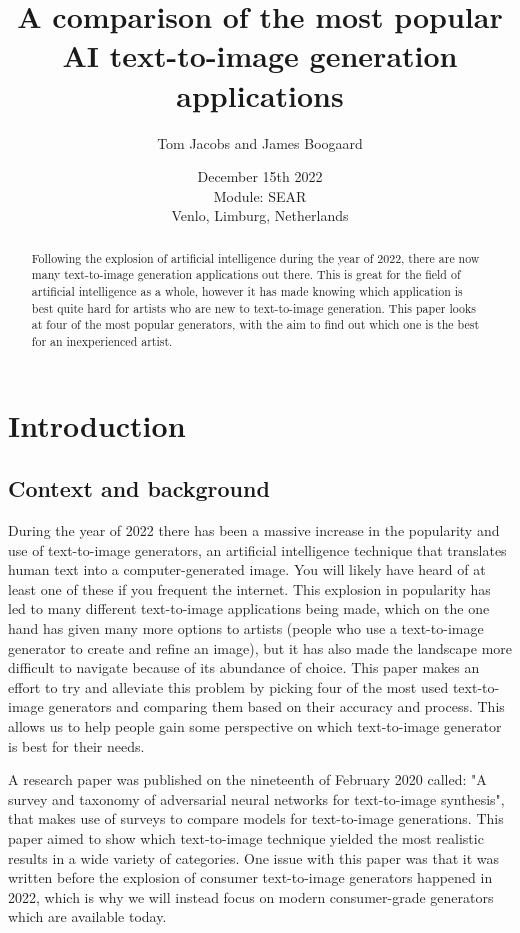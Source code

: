 \documentclass[]{report}
\title{A comparison of the most popular AI text-to-image generation applications}
\author{Tom Jacobs and James Boogaard}
\date{December 15th 2022 \\Module: SEAR \\Venlo, Limburg, Netherlands}
\begin{document}
	
	\maketitle
	
	\begin{abstract}
		Following the explosion of artificial intelligence during the year of 2022, there are now many text-to-image generation applications out there. This is great for the field of artificial intelligence as a whole, however it has made knowing which application is best quite hard for artists who are new to text-to-image generation. This paper looks at four of the most popular generators, with the aim to find out which one is the best for an inexperienced artist.
		
		
	\end{abstract}
	
	\tableofcontents
	\setcounter{page}{3}
	\listoffigures %
	\pagebreak
	
	
	\section{Introduction}
	
	\subsection{Context and background}
	During the year of 2022 there has been a massive increase in the popularity and use of text-to-image generators, an artificial intelligence technique that translates human text into a computer-generated image. You will likely have heard of at least one of these if you frequent the internet. This explosion in popularity has led to many different text-to-image applications being made, which on the one hand has given many more options to artists (people who use a text-to-image generator to create and refine an image), but it has also made the landscape more difficult to navigate because of its abundance of choice. This paper makes an effort to try and alleviate this problem by picking four of the most used text-to-image generators and comparing them based on their accuracy and process. This allows us to help people gain some perspective on which text-to-image generator is best for their needs.
	
	A research paper was published on the nineteenth of February 2020 called: "A survey and taxonomy of adversarial neural networks for text-to-image synthesis", \cite{agnese2020survey} that makes use of surveys to compare models for text-to-image generations. This paper aimed to show which text-to-image technique yielded the most realistic results in a wide variety of categories. One issue with this paper was that it was written before the explosion of consumer text-to-image generators happened in 2022, which is why we will instead focus on modern consumer-grade generators which are available today.
	
\end{document}
